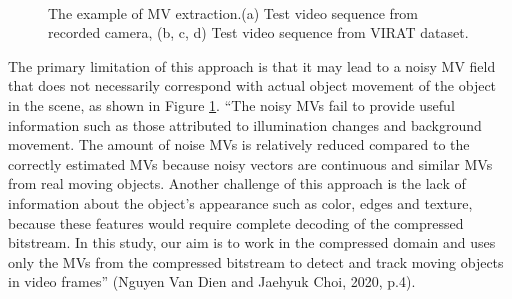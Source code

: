 \begin{figure}
\centering
{}
\\
 \caption{ The example of MV extraction.(a) Test video sequence from recorded camera, (b, c, d) Test video sequence from VIRAT dataset.}
 \label{fig:noise}
\end{figure}

The primary limitation of this approach is that it may lead to a noisy MV field that does not necessarily correspond with actual object movement of the object in the scene, as shown in Figure \ref{fig:noise}. “The noisy MVs fail to provide useful information such as those attributed to illumination changes and background movement. The amount of noise MVs is relatively reduced compared to the correctly estimated MVs because noisy vectors are continuous and similar MVs from real moving objects. Another challenge of this approach is the lack of information about the object’s appearance such as color, edges and texture, because these features would require complete decoding of the compressed bitstream. In this study, our aim is to work in the compressed domain and uses only the MVs from the compressed bitstream to detect and track moving objects in video frames” (Nguyen Van Dien and Jaehyuk Choi, 2020, p.4).

